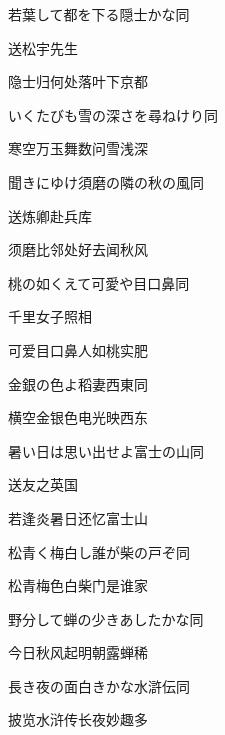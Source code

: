 \begin{haiku}
    {\FH 若葉して都を下る隠士かな}\hfill{\FH 同}

    {\FK 送松宇先生}

    {\FK 隐士归何处落叶下京都}
\end{haiku}

\begin{haiku}
    {\FH いくたびも雪の深さを尋ねけり}\hfill{\FH 同}

    {\FK 寒空万玉舞数问雪浅深}
\end{haiku}

\begin{haiku}
    {\FH 聞きにゆけ須磨の隣の秋の風}\hfill{\FH 同}

    {\FK 送炼卿赴兵库}

    {\FK 须磨比邻处好去闻秋风}
\end{haiku}

\begin{haiku}
    {\FH 桃の如くえて可愛や目口鼻}\hfill{\FH 同}

    {\FK 千里女子照相}

    {\FK 可爱目口鼻人如桃实肥}
\end{haiku}

\begin{haiku}
    {\FH 金銀の色よ稻妻西東}\hfill{\FH 同}

    {\FK 横空金银色电光映西东}
\end{haiku}

\begin{haiku}
    {\FH 暑い日は思い出せよ富士の山}\hfill{\FH 同}

    {\FK 送友之英国}

    {\FK 若逢炎暑日还忆富士山}
\end{haiku}

\begin{haiku}
    {\FH 松青く梅白し誰が柴の戸ぞ}\hfill{\FH 同}

    {\FK 松青梅色白柴门是谁家}
\end{haiku}

\begin{haiku}
    {\FH 野分して蝉の少きあしたかな}\hfill{\FH 同}

    {\FK 今日秋风起明朝露蝉稀}
\end{haiku}

\begin{haiku}
    {\FH 長き夜の面白きかな水滸伝}\hfill{\FH 同}

    {\FK 披览水浒传长夜妙趣多}
\end{haiku}

